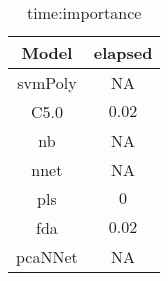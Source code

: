 \begin{table}[!ht]
	\centering
	\begin{tabular}{|c|c|}
		\hline
		Model & elapsed \\ \hline
		svmPoly & NA \\ \hline
		C5.0 & $0.02$ \\ \hline
		nb & NA \\ \hline
		nnet & NA \\ \hline
		pls & $0$ \\ \hline
		fda & $0.02$ \\ \hline
		pcaNNet & NA \\ \hline
	\end{tabular}
	\caption{time:importance}
	\label{tab:time:importance}
\end{table}

